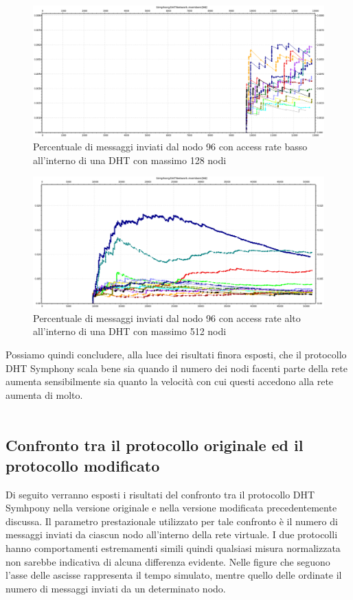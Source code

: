 \documentclass[	
	DIV=calc,
	paper=a4,
	fontsize=11pt,
	onecolumn
]{scrartcl} %
\begin{document}
	\begin{figure}[H]
		\centering
		\includegraphics[scale=0.35]	{SymphonyDHT/plots/PercentageOfMessagesSent/128_Nodes_SlowAccess/SymphonyDHT_128Nodes_SlowAccess_Node96.png}
		\caption{Percentuale di messaggi inviati dal nodo 96 con access rate basso all'interno di una DHT con massimo 128 nodi}
		\label{Figura 24}
	\end{figure}
	\begin{figure}[H]
		\centering
		\includegraphics[scale=0.35]	{SymphonyDHT/plots/PercentageOfMessagesSent/512_Nodes_FastAccess/SymphonyDHT_512Nodes_FastAccess_Node96.png}
		\caption{Percentuale di messaggi inviati dal nodo 96 con access rate alto all'interno di una DHT con massimo 512 nodi}
		\label{Figura 25}
	\end{figure}		
	
	Possiamo quindi concludere, alla luce dei risultati finora esposti, che il protocollo DHT Symphony scala bene sia quando il numero dei nodi facenti parte della rete aumenta sensibilmente sia quanto la velocità con cui questi accedono alla rete aumenta di molto.\\\\
	
	\subsection{Confronto tra il protocollo originale ed il protocollo modificato}
	Di seguito verranno esposti i risultati del confronto tra il protocollo DHT Symhpony nella versione originale e nella versione modificata precedentemente discussa. Il parametro prestazionale utilizzato per tale confronto è il numero di messaggi inviati da ciascun nodo all'interno della rete virtuale. I due protocolli hanno comportamenti estremamenti simili quindi qualsiasi misura normalizzata non sarebbe indicativa di alcuna differenza evidente.
Nelle figure che seguono l'asse delle ascisse rappresenta il tempo simulato, mentre quello delle ordinate il numero di messaggi inviati da un determinato nodo.
	
\end{document}
